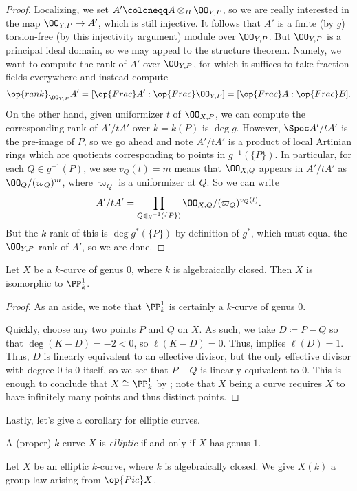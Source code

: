 \documentclass[../notes.tex]{subfiles}
\begin{document}
\begin{proof}
	Localizing, we set $A'\coloneqq A\otimes_B\OO_{Y,P}$, so we are really interested in the map $\OO_{Y,P}\to A'$, which is still injective. It follows that $A'$ is a finite (by $g$) torsion-free (by this injectivity argument) module over $\OO_{Y,P}$. But $\OO_{Y,P}$ is a principal ideal domain, so we may appeal to the structure theorem. Namely, we want to compute the rank of $A'$ over $\OO_{Y,P}$, for which it suffices to take fraction fields everywhere and instead compute
	\[\op{rank}_{\OO_{Y,P}}A'=[\op{Frac}A':\op{Frac}\OO_{Y,P}]=[\op{Frac}A:\op{Frac}B].\]
	On the other hand, given uniformizer $t$ of $\OO_{X,P}$, we can compute the corresponding rank of $A'/tA'$ over $k=k(P)$ is $\deg g$. However, $\Spec A'/tA'$ is the pre-image of $P$, so we go ahead and note $A'/tA'$ is a product of local Artinian rings which are quotients corresponding to points in $g^{-1}(\{P\})$. In particular, for each $Q\in g^{-1}(P)$, we see $v_Q(t)=m$ means that $\OO_{X,Q}$ appears in $A'/tA'$ as $\OO_Q/(\varpi_Q)^{m}$, where $\varpi_Q$ is a uniformizer at $Q$. So we can write
	\[A'/tA'=\prod_{Q\in g^{-1}(\{P\})}\OO_{X,Q}/(\varpi_Q)^{v_Q(t)}.\]
	But the $k$-rank of this is $\deg g^*(\{P\})$ by definition of $g^*$, which must equal the $\OO_{Y,P}$-rank of $A'$, so we are done.
\end{proof}
\begin{corollary}
	Let $X$ be a $k$-curve of genus $0$, where $k$ is algebraically closed. Then $X$ is isomorphic to $\PP^1_k$.
\end{corollary}
\begin{proof}
	As an aside, we note that $\PP^1_k$ is certainly a $k$-curve of genus $0$.

	Quickly, choose any two points $P$ and $Q$ on $X$. As such, we take $D\coloneqq P-Q$ so that $\deg(K-D)=-2<0$, so $\ell(K-D)=0$. Thus,  implies $\ell(D)=1$. Thus, $D$ is linearly equivalent to an effective divisor, but the only effective divisor with degree $0$ is $0$ itself, so we see that $P-Q$ is linearly equivalent to $0$. This is enough to conclude that $X\cong\PP^1_k$ by ; note that $X$ being a curve requires $X$ to have infinitely many points and thus distinct points.
\end{proof}
Lastly, let's give a corollary for elliptic curves.
\begin{definition}[elliptic]
	A (proper) $k$-curve $X$ is \textit{elliptic} if and only if $X$ has genus $1$.
\end{definition}
\begin{corollary}
	Let $X$ be an elliptic $k$-curve, where $k$ is algebraically closed. We give $X(k)$ a group law arising from $\op{Pic}X$.
\end{corollary}
\end{document}
